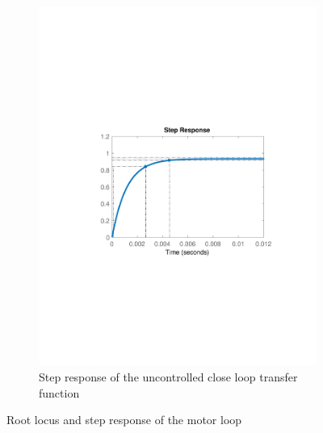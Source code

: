 \begin{figure}[htbp]
\begin{subfigure}{0.5\textwidth}
		\includegraphics[width=\textwidth]{figures/Design/MotorLoop/MotorStepUncontrolled}
		\caption{Step response of the uncontrolled close loop transfer function}
		\label{fig:fig:MotorStepUncontrolled}
	\end{subfigure}
	\caption{Root locus and step response of the motor loop}
\end{figure}

